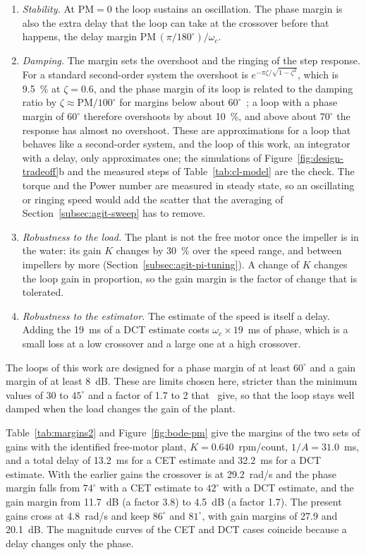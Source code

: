 \begin{enumerate}
    \item \emph{Stability.} At $\mathrm{PM} = 0$ the loop sustains an oscillation. The phase margin is also the extra delay that the loop can take at the crossover before that happens, the delay margin $\mathrm{PM}\,(\pi/180^{\circ})/\omega_c$.
    \item \emph{Damping.} The margin sets the overshoot and the ringing of the step response. For a standard second-order system the overshoot is $e^{-\pi\zeta/\sqrt{1-\zeta^{2}}}$, which is 9.5~\% at $\zeta = 0.6$, and the phase margin of its loop is related to the damping ratio by $\zeta \approx \mathrm{PM}/100^{\circ}$ for margins below about $60^{\circ}$~\citep{ogata2010,nise2020}; a loop with a phase margin of $60^{\circ}$ therefore overshoots by about 10~\%, and above about $70^{\circ}$ the response has almost no overshoot. These are approximations for a loop that behaves like a second-order system, and the loop of this work, an integrator with a delay, only approximates one; the simulations of Figure~\ref{fig:design-tradeoff}b and the measured steps of Table~\ref{tab:cl-model} are the check. The torque and the Power number are measured in steady state, so an oscillating or ringing speed would add the scatter that the averaging of Section~\ref{subsec:agit-sweep} has to remove.
    \item \emph{Robustness to the load.} The plant is not the free motor once the impeller is in the water: its gain $K$ changes by 30~\% over the speed range, and between impellers by more (Section~\ref{subsec:agit-pi-tuning}). A change of $K$ changes the loop gain in proportion, so the gain margin is the factor of change that is tolerated.
    \item \emph{Robustness to the estimator.} The estimate of the speed is itself a delay. Adding the 19~ms of a DCT estimate costs $\omega_c \times 19$~ms of phase, which is a small loss at a low crossover and a large one at a high crossover.
\end{enumerate}
The loops of this work are designed for a phase margin of at least $60^{\circ}$ and a gain margin of at least 8~dB. These are limits chosen here, stricter than the minimum values of 30 to $45^{\circ}$ and a factor of 1.7 to 2 that~\citet{seborg2017} give, so that the loop stays well damped when the load changes the gain of the plant.

Table~\ref{tab:margins2} and Figure~\ref{fig:bode-pm} give the margins of the two sets of gains with the identified free-motor plant, $K = 0.640$~rpm/count, $1/A = 31.0$~ms, and a total delay of 13.2~ms for a CET estimate and 32.2~ms for a DCT estimate. With the earlier gains the crossover is at 29.2~rad/s and the phase margin falls from $74^{\circ}$ with a CET estimate to $42^{\circ}$ with a DCT estimate, and the gain margin from 11.7~dB (a factor 3.8) to 4.5~dB (a factor 1.7). The present gains cross at 4.8~rad/s and keep $86^{\circ}$ and $81^{\circ}$, with gain margins of 27.9 and 20.1~dB. The magnitude curves of the CET and DCT cases coincide because a delay changes only the phase.


